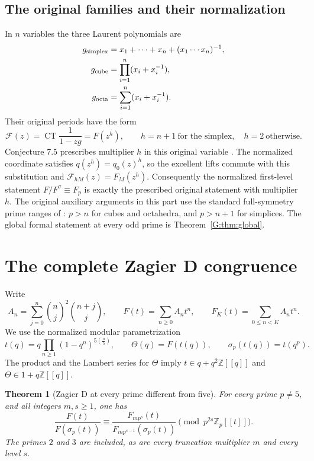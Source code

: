 \documentclass[11pt,a4paper]{article}
\newtheorem{theorem}{Theorem}[section]
\theoremstyle{definition}\newtheorem{definition}[theorem]{Definition}
\theoremstyle{remark}\newtheorem{remark}[theorem]{Remark}
\DeclareMathOperator{\CT}{CT}
\numberwithin{equation}{section}
\begin{document}
\subsection{The original families and their normalization}

In $n$ variables the three Laurent polynomials are
\[
 \begin{aligned}
 g_{\rm simplex}&=x_1+\cdots+x_n+(x_1\cdots x_n)^{-1},\\
 g_{\rm cube}&=\prod_{i=1}^n(x_i+x_i^{-1}),\\
 g_{\rm octa}&=\sum_{i=1}^n(x_i+x_i^{-1}).
 \end{aligned}
\]
Their original periods have the form
\[
 \mathcal F(z)=\CT\frac1{1-zg}=F(z^h),\qquad
 h=n+1\ \text{for the simplex},\quad h=2\ \text{otherwise}.
\]
Conjecture 7.5 prescribes multiplier $h$ in this original variable
\cite[Conjecture 7.5]{BV3}.
The normalized coordinate satisfies $q(z^h)=q_0(z)^h$, so the
excellent lifts commute with this substitution and
$\mathcal F_{hM}(z)=F_M(z^h)$.
Consequently the normalized first-level statement $F/F^\sigma\equiv F_p$
is exactly the prescribed original statement with multiplier $h$.
The original auxiliary arguments in this part use the standard
full-symmetry prime ranges of \cite[Theorem 7.3]{BV3}: $p>n$
for cubes and octahedra, and $p>n+1$ for simplices. The global
formal statement at every odd prime is Theorem~\ref{G:thm:global}.

\section{The complete Zagier D congruence}\label{T:source-main-2}
\label{T:sec:zagier-complete}

Write
\[
 A_n=\sum_{j=0}^{n}\binom nj^2\binom{n+j}{j},\qquad
 F(t)=\sum_{n\ge0}A_nt^n,\qquad
 F_K(t)=\sum_{0\le n<K}A_nt^n.
\]
We use the normalized modular parametrization
\[
 t(q)=q\prod_{n\ge1}(1-q^n)^{5(\frac n5)},\qquad
 \Theta(q)=F(t(q)),\qquad
 \sigma_p(t(q))=t(q^p).
\]
The product and the Lambert series for \(\Theta\) imply
\(t\in q+q^2\mathbb Z[[q]]\) and
\(\Theta\in1+q\mathbb Z[[q]]\).

\begin{theorem}[Zagier D at every prime different from five]
\label{T:thm:zagier-nonsplit-complete}
For every prime \(p\ne5\), and all integers
\(m,s\ge1\), one has
\[
 \frac{F(t)}{F(\sigma_p(t))}
 \equiv
 \frac{F_{mp^s}(t)}{F_{mp^{s-1}}(\sigma_p(t))}
 \pmod{p^{2s}\mathbb Z_p[[t]]}.
\]
The primes \(2\) and \(3\) are included, as are every truncation
multiplier \(m\) and every level \(s\).
\end{theorem}
\end{document}
